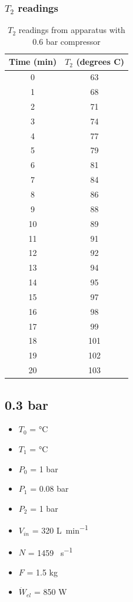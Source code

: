 \documentclass[class=article, crop=false, 12pt,a4paper]{standalone}
\numberwithin{equation}{section}
\begin{document}
\subsubsection{\(T_2\) readings}
\begin{table}
  \centering
    \begin{tabular}{|c|c|}
      \hline
      Time (\si{\minute}) & \(T_2\) (degrees C)\\
      \hline  
      0 & 63\\
      1 & 68\\
      2 & 71\\
      3 & 74\\
      4 & 77\\
      5 & 79\\
      6 & 81\\
      7 & 84\\
      8 & 86\\
      9 & 88\\
      10 & 89\\
      11 & 91\\
      12 & 92\\
      13 & 94\\
      14 & 95\\
      15 & 97\\
      16 & 98\\
      17 & 99\\
      18 & 101\\
      19 & 102\\
      20 & 103\\
      \hline
    \end{tabular}
  \caption{\(T_2\) readings from apparatus with 0.6 bar compressor}
  \label{table:2}
\end{table}
\subsection{0.3 bar}
\begin{multicols}{2}
  \begin{itemize}[noitemsep]
    \item \(T_0\) = \si{\celsius}
    \item \(T_1\) = \si{\celsius}
    \item \(P_0\) = 1 \si{\bar}
    \item \(P_1\) = 0.08 \si{\bar}
    \item \(P_2\) = 1 \si{\bar}
    \item \(V_{in}\) = 320 \si{\liter\per\minute}
    \item \(N\) = 1459 \si{\rev\per\second}
    \item \(F\) = 1.5 \si{\kilogram}
    \item \(\dot{W}_{el}\) = 850 \si{\watt}
  \end{itemize}
\end{multicols}
\end{document}
